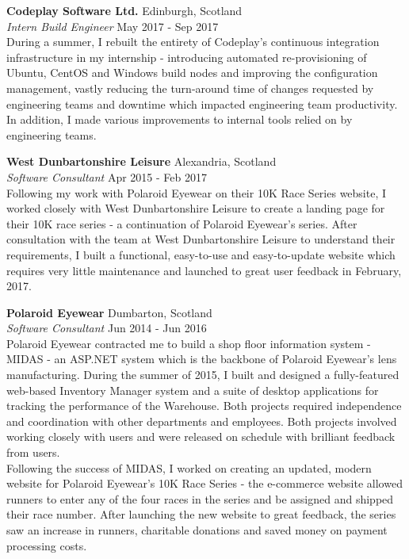 \documentclass[a4paper]{article}
\begin{document}
\textbf{Codeplay Software Ltd.} \hfill {\color{gray} Edinburgh, Scotland} \\
\textit{Intern Build Engineer} \hfill {\color{gray} May 2017 - Sep 2017} \\
\vspace{2mm}
During a summer, I rebuilt the entirety of Codeplay's continuous integration infrastructure
in my internship - introducing automated re-provisioning of Ubuntu, CentOS and Windows build nodes
and improving the configuration management, vastly reducing the turn-around time of changes
requested by engineering teams and downtime which impacted engineering team productivity. In
addition, I made various improvements to internal tools relied on by engineering teams.
\vspace{2mm}

\textbf{West Dunbartonshire Leisure} \hfill {\color{gray} Alexandria, Scotland} \\
\textit{Software Consultant} \hfill {\color{gray} Apr 2015 - Feb 2017} \\
\vspace{2mm}
Following my work with Polaroid Eyewear on their 10K Race Series website, I worked closely with
West Dunbartonshire Leisure to create a landing page for their 10K race series - a continuation of
Polaroid Eyewear’s series. After consultation with the team at West Dunbartonshire Leisure to
understand their requirements, I built a functional, easy-to-use and easy-to-update website which
requires very little maintenance and launched to great user feedback in February, 2017.
\vspace{2mm}

\textbf{Polaroid Eyewear} \hfill {\color{gray} Dumbarton, Scotland} \\
\textit{Software Consultant} \hfill {\color{gray} Jun 2014 - Jun 2016} \\
\vspace{2mm}
Polaroid Eyewear contracted me to build a shop floor information system - MIDAS - an ASP.NET
system which is the backbone of Polaroid Eyewear's lens manufacturing.
\vspace{2mm}
During the summer of 2015, I built and designed a fully-featured web-based Inventory Manager system
and a suite of desktop applications for tracking the performance of the Warehouse. Both projects
required independence and coordination with other departments and employees. Both projects involved
working closely with users and were released on schedule with brilliant feedback from users. \\
\vspace{2mm}
Following the success of MIDAS, I worked on creating an updated, modern website for Polaroid
Eyewear's 10K Race Series - the e-commerce website allowed runners to enter any of the four races
in the series and be assigned and shipped their race number. After launching the new website to
great feedback, the series saw an increase in runners, charitable donations and saved money on
payment processing costs.
\vspace{2mm}
\end{document}
